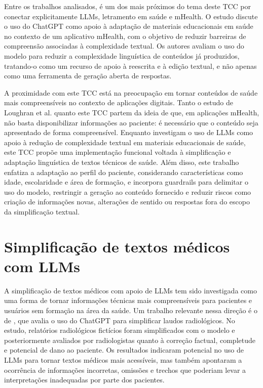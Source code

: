 Entre os trabalhos analisados,  é um dos mais próximos do tema deste TCC por conectar explicitamente LLMs, letramento em saúde e mHealth. O estudo discute o uso do ChatGPT como apoio à adaptação de materiais educacionais em saúde no contexto de um aplicativo mHealth, com o objetivo de reduzir barreiras de compreensão associadas à complexidade textual. Os autores avaliam o uso do modelo para reduzir a complexidade linguística de conteúdos já produzidos, tratando-o como um recurso de apoio à reescrita e à edição textual, e não apenas como uma ferramenta de geração aberta de respostas.

A proximidade com este TCC está na preocupação em tornar conteúdos de saúde mais compreensíveis no contexto de aplicações digitais. Tanto o estudo de Loughran et al. quanto este TCC partem da ideia de que, em aplicações mHealth, não basta disponibilizar informações ao paciente: é necessário que o conteúdo seja apresentado de forma compreensível. Enquanto  investigam o uso de LLMs como apoio à redução de complexidade textual em materiais educacionais de saúde, este TCC propõe uma implementação funcional voltada à simplificação e adaptação linguística de textos técnicos de saúde. Além disso, este trabalho enfatiza a adaptação ao perfil do paciente, considerando características como idade, escolaridade e área de formação, e incorpora guardrails para delimitar o uso do modelo, restringir a geração ao conteúdo fornecido e reduzir riscos como criação de informações novas, alterações de sentido ou respostas fora do escopo da simplificação textual.

\section{Simplificação de textos médicos com LLMs}
\label{sec:simplificacao-textos-medicos-llms}

A simplificação de textos médicos com apoio de LLMs tem sido investigada como uma forma de tornar informações técnicas mais compreensíveis para pacientes e usuários sem formação na área da saúde. Um trabalho relevante nessa direção é o de , que avalia o uso do ChatGPT para simplificar laudos radiológicos. No estudo, relatórios radiológicos fictícios foram simplificados com o modelo e posteriormente avaliados por radiologistas quanto à correção factual, completude e potencial de dano ao paciente. Os resultados indicaram potencial no uso de LLMs para tornar textos médicos mais acessíveis, mas também apontaram a ocorrência de informações incorretas, omissões e trechos que poderiam levar a interpretações inadequadas por parte dos pacientes.

